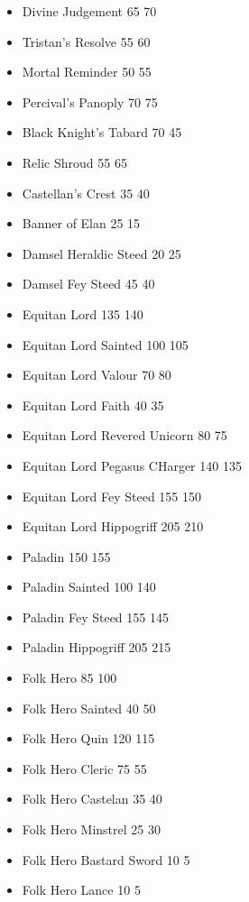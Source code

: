 \subtitle{Price Changes}

\begin{multicols}{2}
\begin{itemize}
	\item Divine Judgement 65 \costup{} 70
	\item Tristan's Resolve 55 \costup{} 60
	\item Mortal Reminder 50 \costup{} 55
	\item Percival's Panoply 70 \costup{} 75
	\item Black Knight's Tabard 70 \costdown{} 45
	\item Relic Shroud 55 \costup{} 65
	\item Castellan's Crest 35 \costup{} 40
	\item Banner of Elan 25 \costdown{} 15
	\item Damsel Heraldic Steed 20 \costup{} 25
	\item Damsel Fey Steed 45 \costdown{} 40
	\item Equitan Lord 135 \costup{} 140
	\item Equitan Lord Sainted 100 \costup{} 105
	\item Equitan Lord Valour 70 \costup{} 80
	\item Equitan Lord Faith 40 \costdown{} 35
	\item Equitan Lord Revered Unicorn 80 \costdown{} 75
	\item Equitan Lord Pegasus CHarger 140 \costdown{} 135
	\item Equitan Lord Fey Steed 155 \costdown{} 150
	\item Equitan Lord Hippogriff 205 \costup{} 210
	\item Paladin 150 \costup{} 155
	\item Paladin Sainted 100 \costup{} 140
	\item Paladin Fey Steed 155 \costdown{} 145
	\item Paladin Hippogriff 205 \costup{} 215
	\item Folk Hero 85 \costup{} 100
	\item Folk Hero Sainted 40 \costup{} 50
	\item Folk Hero Quin 120 \costdown{} 115
	\item Folk Hero Cleric 75 \costdown{} 55
	\item Folk Hero Castelan 35 \costup{} 40
	\item Folk Hero Minstrel 25 \costup{} 30
	\item Folk Hero Bastard Sword 10 \costdown{} 5
	\item Folk Hero Lance 10 \costdown{} 5

\end{itemize}
\end{multicols}
